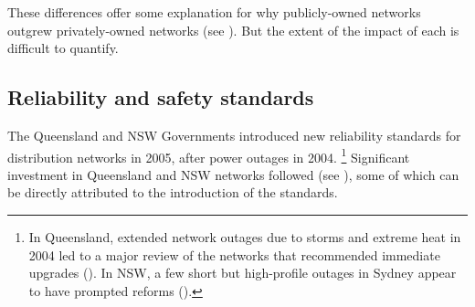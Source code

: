 \documentclass[FrontPage]{grattan}
\begin{document}



These differences offer some explanation for why publicly-owned networks outgrew privately-owned networks (see ). But the extent of the impact of each is difficult to quantify. 

\subsection{Reliability and safety standards}\label{subsec:reliability-standards}
The Queensland and NSW Governments introduced new reliability standards for distribution networks in 2005, after power outages in 2004.%
\footnote{In Queensland, extended network outages due to storms and extreme heat in 2004 led to a major review of the networks that recommended immediate upgrades (\textcite{Somerville2004EDSDreview}). In NSW, a few short but high-profile outages in Sydney appear to have prompted reforms (\textcite{Maley2004SydneyBlackouts}).}
Significant investment in Queensland and NSW networks followed (see ), some of which can be directly attributed to the introduction of the standards. 
\end{document}
